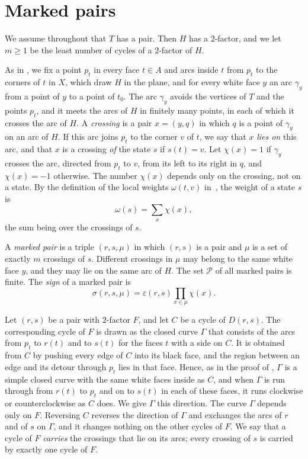 \documentclass[a4paper]{amsart}
\newcommand{\eps}{\varepsilon}
\newcommand{\cP}{\mathcal P}
\begin{document}
\section{Marked pairs}

We assume throughout that $T$ has a pair.
Then $H$ has a $2$-factor, and we let $m\ge1$ be the least number of cycles of a $2$-factor of $H$.

As in \cite[Section~6]{P}, we fix a point $p_t$ in every face $t\in A$ and arcs inside $t$ from $p_t$ to the corners of $t$ in $X$, which draw $H$ in the plane, and for every white face $y$ an arc $\gamma_y$ from a point of $y$ to a point of $t_0$.
The arc $\gamma_y$ avoids the vertices of $T$ and the points $p_t$, and it meets the arcs of $H$ in finitely many points, in each of which it crosses the arc of $H$.
A \emph{crossing} is a pair $x=(y,q)$ in which $q$ is a point of $\gamma_y$ on an arc of $H$.
If this arc joins $p_t$ to the corner $v$ of $t$, we say that $x$ \emph{lies on} this arc, and that $x$ is a crossing \emph{of} the state $s$ if $s(t)=v$.
Let $\chi(x)=1$ if $\gamma_y$ crosses the arc, directed from $p_t$ to $v$, from its left to its right in $q$, and $\chi(x)=-1$ otherwise.
The number $\chi(x)$ depends only on the crossing, not on a state.
By the definition of the local weights $\omega(t,v)$ in~\cite{P}, the weight of a state $s$ is
\begin{equation}\label{weight}
\omega(s)=\sum_{x}\chi(x),
\end{equation}
the sum being over the crossings of $s$.

A \emph{marked pair} is a triple $(r,s,\mu)$ in which $(r,s)$ is a pair and $\mu$ is a set of exactly $m$ crossings of $s$.
Different crossings in $\mu$ may belong to the same white face $y$, and they may lie on the same arc of $H$.
The set $\cP$ of all marked pairs is finite.
The \emph{sign} of a marked pair is
\[
\sigma(r,s,\mu)=\eps(r,s)\prod_{x\in\mu}\chi(x).
\]

Let $(r,s)$ be a pair with $2$-factor $F$, and let $C$ be a cycle of $D(r,s)$.
The corresponding cycle of $F$ is drawn as the closed curve $\Gamma$ that consists of the arcs from $p_t$ to $r(t)$ and to $s(t)$ for the faces $t$ with a side on $C$.
It is obtained from $C$ by pushing every edge of $C$ into its black face, and the region between an edge and its detour through $p_t$ lies in that face.
Hence, as in the proof of \cite[Lemma~6.6]{P}, $\Gamma$ is a simple closed curve with the same white faces inside as $C$, and when $\Gamma$ is run through from $r(t)$ to $p_t$ and on to $s(t)$ in each of these faces, it runs clockwise or counterclockwise as $C$ does.
We give $\Gamma$ this direction.
The curve $\Gamma$ depends only on $F$.
Reversing $C$ reverses the direction of $\Gamma$ and exchanges the arcs of $r$ and of $s$ on $\Gamma$, and it changes nothing on the other cycles of $F$.
We say that a cycle of $F$ \emph{carries} the crossings that lie on its arcs; every crossing of $s$ is carried by exactly one cycle of $F$.
\end{document}
